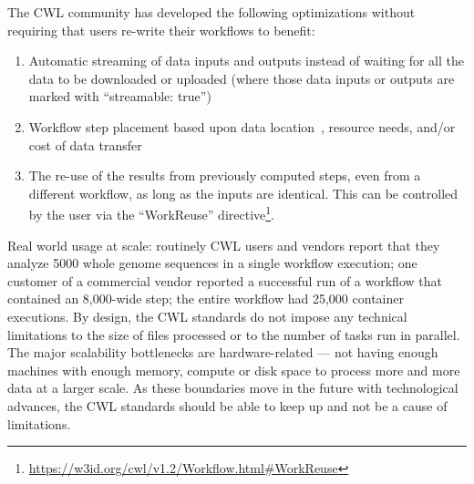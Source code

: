 \documentclass[sigconf,revew,screen,timestamp,nonacm]{acmart}
\newcommand{\todorone}[1]{\todo[color=orange!40]{R1.#1}}
\newcommand{\todortwo}[1]{\todo[linecolor=white,color=KamPurple!40]{R2.#1}}
\begin{document}
{\todortwo{4}The CWL community has developed the following optimizations without requiring that users re-write their workflows to benefit:
\begin{enumerate}
\item Automatic streaming of data inputs and outputs instead of waiting for all the data to be downloaded or uploaded (where those data inputs or outputs are marked with ``streamable: true'')
\item Workflow step placement based upon data location~\cite{jiang_tr-19-01_2019}, resource needs, and/or cost of data transfer~\cite{jiang_pivot_2019}
\item \todorone{4}The re-use of the results from previously computed steps, even from a different workflow, as long as the inputs are identical. This can be controlled by the user via the ``WorkReuse'' directive\footnote{\url{https://w3id.org/cwl/v1.2/Workflow.html\#WorkReuse}}.
\end{enumerate}

Real world usage at scale: routinely CWL users and vendors report that they analyze 5000 whole genome sequences in a single workflow execution; one customer of a commercial vendor reported a successful run of a workflow that contained an 8,000-wide step; the entire workflow had 25,000 container executions. By design, the CWL standards do not impose any technical limitations to the size of files processed or to the number of tasks run in parallel. The major scalability bottlenecks are hardware-related --- not having enough machines with enough memory, compute or disk space to process more and more data at a larger scale. As these boundaries move in the future with technological advances, the CWL standards should be able to keep up and not be a cause of limitations.
}
\end{document}
